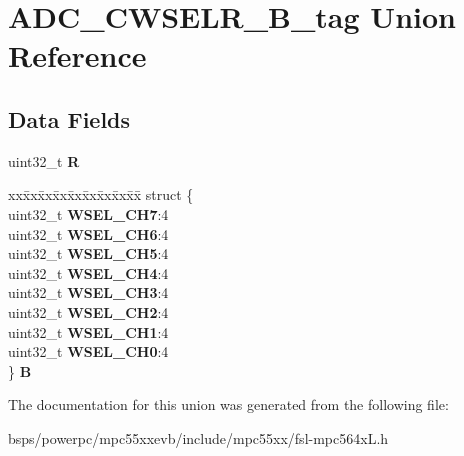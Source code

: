 \hypertarget{unionADC__CWSELR__32B__tag}{}\section{A\+D\+C\+\_\+\+C\+W\+S\+E\+L\+R\+\_\+B\+\_\+tag Union Reference}
\label{unionADC__CWSELR__32B__tag}
\subsection*{Data Fields}
\begin{DoxyCompactItemize}
\item 
\mbox{\label{unionADC__CWSELR__32B__tag_aabcbddb0c0f8ea525fd5fcf70f6cfb14}} 
uint32\+\_\+t {\bfseries R}
\item 
\mbox{\label{unionADC__CWSELR__32B__tag_a49cd7596e0916c89d370c85a5e8cd246}} 
\begin{tabbing}
xx\=xx\=xx\=xx\=xx\=xx\=xx\=xx\=xx\=\kill
struct \{\\
\>uint32\_t {\bfseries WSEL\_CH7}:4\\
\>uint32\_t {\bfseries WSEL\_CH6}:4\\
\>uint32\_t {\bfseries WSEL\_CH5}:4\\
\>uint32\_t {\bfseries WSEL\_CH4}:4\\
\>uint32\_t {\bfseries WSEL\_CH3}:4\\
\>uint32\_t {\bfseries WSEL\_CH2}:4\\
\>uint32\_t {\bfseries WSEL\_CH1}:4\\
\>uint32\_t {\bfseries WSEL\_CH0}:4\\
\} {\bfseries B}\\

\end{tabbing}\end{DoxyCompactItemize}


The documentation for this union was generated from the following file\+:\begin{DoxyCompactItemize}
\item 
bsps/powerpc/mpc55xxevb/include/mpc55xx/fsl-\/mpc564x\+L.\+h\end{DoxyCompactItemize}
